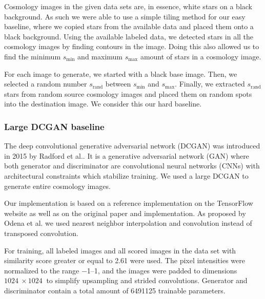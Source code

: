 \documentclass[10pt,conference,compsocconf]{IEEEtran}
\begin{document}

Cosmology images in the given data sets are, in essence, white stars on a black background. As such we were able to use a simple tiling method for our easy baseline, where we copied stars from the available data and placed them onto a black background. Using the available labeled data, we detected stars in all the cosmology images by finding contours in the image. Doing this also allowed us to find the minimum $s_{\text{min}}$ and maximum $s_{\text{max}}$ amount of stars in a cosmology image.

For each image to generate, we started with a black base image. Then, we selected a random number $s_{\text{rand}}$ between $s_{\text{min}}$ and $s_{\text{max}}$. Finally, we extracted $s_{\text{rand}}$ stars from random source cosmology images and placed them on random spots into the destination image. We consider this our hard baseline.

\subsubsection{Large DCGAN baseline}

The deep convolutional generative adversarial network (DCGAN) was introduced in 2015 by Radford et al.\@ \cite{Radford}. It is a generative adversarial network (GAN) where both generator and discriminator are convolutional neural networks (CNNs) with architectural constraints which stabilize training. We used a large DCGAN to generate entire cosmology images. 

Our implementation is based on a reference implementation on the TensorFlow website \cite{dcgantf} as well as on the original paper and implementation. As proposed by Odena et al.\@ \cite{Odena} we used nearest neighbor interpolation and convolution instead of transposed convolution.

For training, all labeled images and all scored images in the data set with similarity score greater or equal to \SI{2.61}{} were used. The pixel intensities were normalized to the range \SIrange{-1}{1}{}, and the images were padded to dimensions $\SI{1024}{}\times\SI{1024}{}$ to simplify upsampling and strided convolutions. Generator and discriminator contain a total amount of \SI{6491125}{} trainable parameters.
\end{document}
